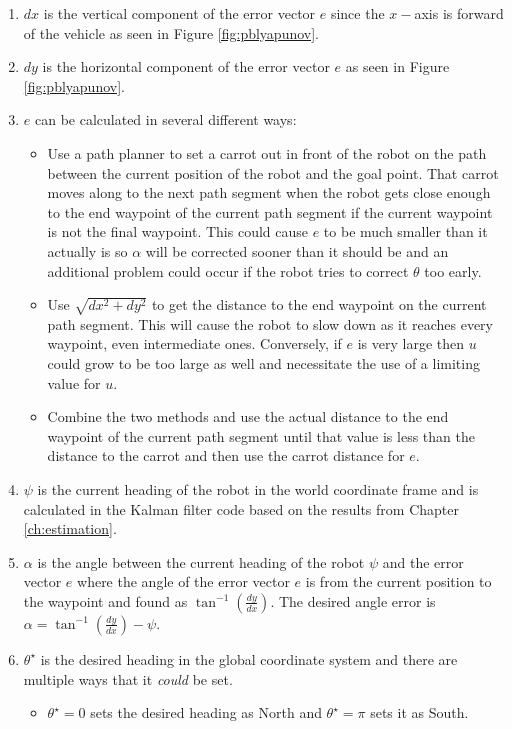 \begin{enumerate}
\item $dx$ is the vertical component of the error vector $e$ since the $x-$axis is forward of the vehicle as seen in Figure \ref{fig:pblyapunov}.
\item $dy$ is the horizontal component of the error vector $e$ as seen in Figure \ref{fig:pblyapunov}.
\item $e$ can be calculated in several different ways:
\begin{itemize}
\item Use a path planner to set a carrot out in front of the robot on the path between the current position of the robot and the goal point. That carrot moves along to the next path segment when the robot gets close enough to the end waypoint of the current path segment if the current waypoint is not the final waypoint. This could cause $e$ to be much smaller than it actually is so $\alpha$ will be corrected sooner than it should be and an additional problem could occur if the robot tries to correct $\theta$ too early.
\item Use $\sqrt{dx^2 + dy^2}$ to get the distance to the end waypoint on the current path segment. This will cause the robot to slow down as it reaches every waypoint, even intermediate ones. Conversely, if $e$ is very large then $u$ could grow to be too large as well and necessitate the use of a limiting value for $u$.
\item Combine the two methods and use the actual distance to the end waypoint of the current path segment until that value is less than the distance to the carrot and then use the carrot distance for $e$.
\end{itemize}
\item $\psi$ is the current heading of the robot in the world coordinate frame and is calculated in the Kalman filter code based on the results from Chapter \ref{ch:estimation}.
\item $\alpha$ is the angle between the current heading of the robot $\psi$ and the error vector $e$ where the angle of the error vector $e$ is from the current position to the waypoint and found as $\tan^{-1}\left(\frac{dy}{dx}\right)$. The desired angle error is $\alpha = \tan^{-1}\left(\frac{dy}{dx}\right) - \psi$.
\item $\theta^\star$ is the desired heading in the global coordinate system and there are multiple ways that it \textit{could} be set.
\begin{itemize}
\item $\theta^\star=0$ sets the desired heading as North and $\theta^\star=\pi$ sets it as South.

\end{itemize}
\end{enumerate}
